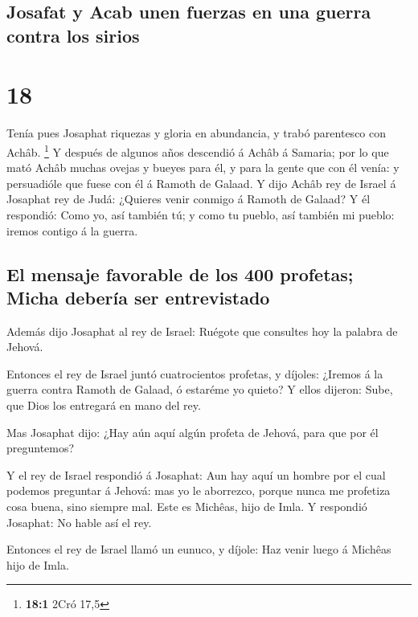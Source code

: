 \hypertarget{josafat-y-acab-unen-fuerzas-en-una-guerra-contra-los-sirios}{%
\subsection{Josafat y Acab unen fuerzas en una guerra contra los
sirios}\label{josafat-y-acab-unen-fuerzas-en-una-guerra-contra-los-sirios}}

\hypertarget{section-17}{%
\section{18}\label{section-17}}

 Tenía pues Josaphat riquezas y gloria en abundancia, y
trabó parentesco con Achâb. \footnote{\textbf{18:1} 2Cró 17,5}
 Y después de algunos años descendió á Achâb á Samaria;
por lo que mató Achâb muchas ovejas y bueyes para él, y para la gente
que con él venía: y persuadióle que fuese con él á Ramoth de Galaad.
 Y dijo Achâb rey de Israel á Josaphat rey de Judá:
¿Quieres venir conmigo á Ramoth de Galaad? Y él respondió: Como yo, así
también tú; y como tu pueblo, así también mi pueblo: iremos contigo á la
guerra.

\hypertarget{el-mensaje-favorable-de-los-400-profetas-micha-deberuxeda-ser-entrevistado}{%
\subsection{El mensaje favorable de los 400 profetas; Micha debería ser
entrevistado}\label{el-mensaje-favorable-de-los-400-profetas-micha-deberuxeda-ser-entrevistado}}

 Además dijo Josaphat al rey de Israel: Ruégote que
consultes hoy la palabra de Jehová.

 Entonces el rey de Israel juntó cuatrocientos profetas, y
díjoles: ¿Iremos á la guerra contra Ramoth de Galaad, ó estaréme yo
quieto? Y ellos dijeron: Sube, que Dios los entregará en mano del rey.

 Mas Josaphat dijo: ¿Hay aún aquí algún profeta de Jehová,
para que por él preguntemos?

 Y el rey de Israel respondió á Josaphat: Aun hay aquí un
hombre por el cual podemos preguntar á Jehová: mas yo le aborrezco,
porque nunca me profetiza cosa buena, sino siempre mal. Este es Michêas,
hijo de Imla. Y respondió Josaphat: No hable así el rey.

 Entonces el rey de Israel llamó un eunuco, y díjole: Haz
venir luego á Michêas hijo de Imla.

